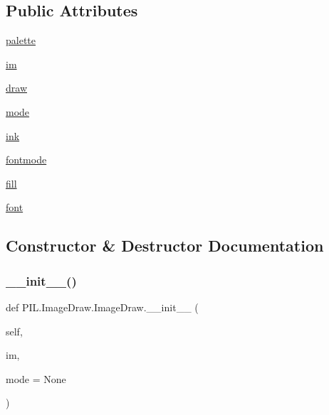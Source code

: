\subsection*{Public Attributes}
\begin{DoxyCompactItemize}
\item 
\hyperlink{classPIL_1_1ImageDraw_1_1ImageDraw_a44f1e4021ddc1df2c0c6c844c4ede993}{palette}
\item 
\hyperlink{classPIL_1_1ImageDraw_1_1ImageDraw_afa28e22f8d9b954ba6bd1e2ca6cb0498}{im}
\item 
\hyperlink{classPIL_1_1ImageDraw_1_1ImageDraw_ad04b4088fe06e35e7de5648b79212ffd}{draw}
\item 
\hyperlink{classPIL_1_1ImageDraw_1_1ImageDraw_a72a51b94d66cbfd7d8f03f7385d31b10}{mode}
\item 
\hyperlink{classPIL_1_1ImageDraw_1_1ImageDraw_a674ecdb85865984144de2123c3aee131}{ink}
\item 
\hyperlink{classPIL_1_1ImageDraw_1_1ImageDraw_a829a165d0aa307273bdcb682370cc544}{fontmode}
\item 
\hyperlink{classPIL_1_1ImageDraw_1_1ImageDraw_aae14451f06798e855e851364079caa8a}{fill}
\item 
\hyperlink{classPIL_1_1ImageDraw_1_1ImageDraw_a1a0babedef110fd4d10b55fa4041024d}{font}
\end{DoxyCompactItemize}


\subsection{Constructor \& Destructor Documentation}
\mbox{\label{classPIL_1_1ImageDraw_1_1ImageDraw_adc7e9dc9215805aa2da5792dbdbf8e55}} 
\subsubsection{\texorpdfstring{\+\_\+\+\_\+init\+\_\+\+\_\+()}{\_\_init\_\_()}}
{\footnotesize\ttfamily def P\+I\+L.\+Image\+Draw.\+Image\+Draw.\+\_\+\+\_\+init\+\_\+\+\_\+ (\begin{DoxyParamCaption}\item[{}]{self,  }\item[{}]{im,  }\item[{}]{mode = {\ttfamily None} }\end{DoxyParamCaption})}

